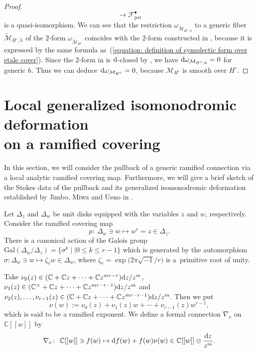 \documentclass[pdftex]{sigma}
\numberwithin{equation}{section}
\begin{document}
\begin{proof}
\[ \longrightarrow {\mathcal F}^{\bullet}_{\mathrm{par}}
\]
is a quasi-isomorphism.
We can see
that the restriction $\omega_{\tilde{\mathcal M}_{H^{\circ},h}}$
to a generic fiber $\tilde{\mathcal M}_{H^{\circ},h}$
of the $2$-form $\omega_{\tilde{\mathcal M}_{H^{\circ}}}$
coincides with the $2$-form
constructed in \cite[Proposition~7.2]{Inaba-1},
because it is expressed by the same formula as~(\ref{equation: definition of symplectic form over etale cover}).
Since the $2$-form in \cite[Proposition~7.2]{Inaba-1} is ${\rm d}$-closed
by \cite[Proposition~7.3]{Inaba-1},
we have ${\rm d}\omega_{{\mathcal M}_{H^{\circ},h}}=0$ for generic $h$.
Thus we can deduce ${\rm d}\omega_{{\mathcal M}_{H^{\circ}}}=0$,
because ${\mathcal M}_{H^{\circ}}$ is smooth over $H^{\circ}$.
\end{proof}

\section[Local generalized isomonodromic deformation on a ramified covering]{Local generalized isomonodromic deformation\\ on a ramified covering}
\label{section: local analytic theory}


In this section, we will consider the pullback of a generic ramified connection
via a local analytic ramified covering map.
Furthermore, we will give a brief sketch of the Stokes data of the pullback
and its generalized isomonodromic deformation
established by Jimbo, Miwa and Ueno in \cite{Jimbo-Miwa-Ueno}.

Let $\Delta_z$ and $\Delta_w$ be unit disks
equipped with the variables $z$ and $w$, respectively.
Consider the ramified covering map
\begin{equation} \label{ramified covering map}
 p \colon \ \Delta_w \ni w \mapsto w^r=z \in \Delta_z.
\end{equation}
There is a canonical action of the Galois group
$\mathrm{Gal}(\Delta_w/\Delta_z)=\{ \sigma^k \mid| 0\leq k\leq r-1 \}$
which is generated by the automorphism
$\sigma\colon \Delta_w \ni w\mapsto \zeta_r w\in \Delta_w$,
where $\zeta_r=\exp\big(2\pi\sqrt{-1}/r\big)$ is a~primitive root of unity.

Take
$\nu_0(z)\in(\mathbb{C}+\mathbb{C}z+\cdots+\mathbb{C}z^{mr-r}){\rm d}z/z^m$,
$\nu_1(z)\in (\mathbb{C}^{\times}+\mathbb{C}z+\cdots+\mathbb{C}z^{mr-r-1}){\rm d}z/z^m$
and
$\nu_2(z),\dots,\nu_{r-1}(z)\in(\mathbb{C}+\mathbb{C}z+\cdots+\mathbb{C}z^{mr-r-1}){\rm d}z/z^m$.
Then we put
\[
 \nu(w):=\nu_0(z)+\nu_1(z)w+\cdots+\nu_{r-1}(z)w^{r-1},
\]
which is said to be a ramified exponent.
We define a formal connection
$\nabla_{\nu}$ on $\mathbb{C}[[w]]$ by
\[
 \nabla_{\nu} \colon \ \mathbb{C}[[w]] \ni f(w)
 \mapsto {\rm d}f(w)+f(w)\nu(w) \in \mathbb{C}[[w]]\otimes\frac{{\rm d}z}{z^m}.
\]
\end{document}
